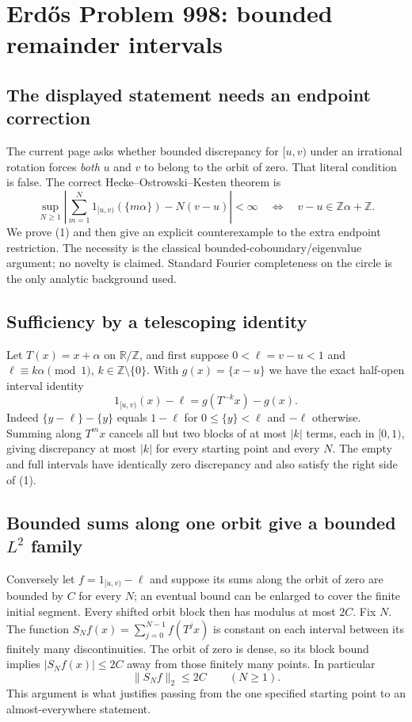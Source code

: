 \section*{Erd\H{o}s Problem 998: bounded remainder intervals}
\subsection*{The displayed statement needs an endpoint correction}
The current page asks whether bounded discrepancy for $[u,v)$ under an irrational rotation forces \emph{both} $u$ and $v$ to belong to the orbit of zero. That literal condition is false. The correct Hecke--Ostrowski--Kesten theorem is
\[
 \sup_{N\ge1}\left|\sum_{m=1}^{N}1_{[u,v)}(\{m\alpha\})-N(v-u)\right|<\infty
 \quad\Longleftrightarrow\quad
 v-u\in\mathbb Z\alpha+\mathbb Z.
 \tag{1}
\]
We prove (1) and then give an explicit counterexample to the extra endpoint restriction. The necessity is the classical bounded-coboundary/eigenvalue argument; no novelty is claimed. Standard Fourier completeness on the circle is the only analytic background used.

\subsection*{Sufficiency by a telescoping identity}
Let $T(x)=x+\alpha$ on $\mathbb R/\mathbb Z$, and first suppose
$0<\ell=v-u<1$ and $\ell\equiv k\alpha\pmod1$, $k\in\mathbb Z\setminus\{0\}$.
With $g(x)=\{x-u\}$ we have the exact half-open interval identity
\[
 1_{[u,v)}(x)-\ell=g(T^{-k}x)-g(x).
\]
Indeed $\{y-\ell\}-\{y\}$ equals $1-\ell$ for $0\le\{y\}<\ell$ and $-\ell$ otherwise.
Summing along $T^m x$ cancels all but two blocks of at most $|k|$ terms, each in $[0,1)$, giving discrepancy at most $|k|$ for every starting point and every $N$.
The empty and full intervals have identically zero discrepancy and also satisfy the right side of (1).

\subsection*{Bounded sums along one orbit give a bounded $L^2$ family}
Conversely let $f=1_{[u,v)}-\ell$ and suppose its sums along the orbit of zero are bounded by $C$ for every $N$; an eventual bound can be enlarged to cover the finite initial segment.
Every shifted orbit block then has modulus at most $2C$.
Fix $N$. The function $S_Nf(x)=\sum_{j=0}^{N-1}f(T^jx)$ is constant on each interval between its finitely many discontinuities. The orbit of zero is dense, so its block bound implies
$|S_Nf(x)|\le2C$ away from those finitely many points. In particular
\[
 \|S_Nf\|_2\le2C\qquad(N\ge1).
 \tag{2}
\]
This argument is what justifies passing from the one specified starting point to an almost-everywhere statement.

